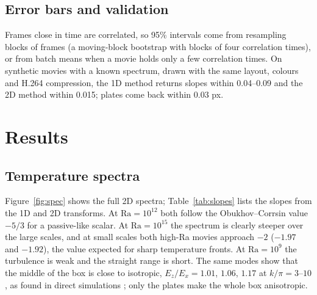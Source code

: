 \documentclass[11pt,a4paper]{article}
\begin{document}
\subsection{Error bars and validation}
Frames close in time are correlated, so 95\% intervals come from resampling blocks of frames (a moving-block bootstrap with blocks of four correlation times), or from batch means when a movie holds only a few correlation times. On synthetic movies with a known spectrum, drawn with the same layout, colours and H.264 compression, the 1D method returns slopes within 0.04--0.09 and the 2D method within 0.015; plates come back within 0.03 px.



\section{Results}
\subsection{Temperature spectra}
Figure~\ref{fig:spec} shows the full 2D spectra; Table~\ref{tab:slopes} lists the slopes from the 1D and 2D transforms. At $\mathrm{Ra}=10^{12}$ both follow the Obukhov--Corrsin value $-5/3$ for a passive-like scalar. At $\mathrm{Ra}=10^{15}$ the spectrum is clearly steeper over the large scales, and at small scales both high-Ra movies approach $-2$ ($-1.97$ and $-1.92$), the value expected for sharp temperature fronts. At $\mathrm{Ra}=10^{9}$ the turbulence is weak and the straight range is short. The same modes show that the middle of the box is close to isotropic, $E_z/E_x=1.01$, $1.06$, $1.17$ at $k/\pi=3$--$10$, as found in direct simulations \cite{nath2016}; only the plates make the whole box anisotropic.
\end{document}
